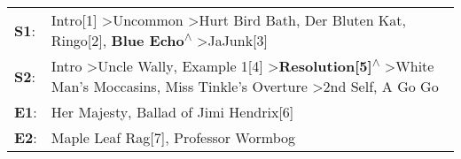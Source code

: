 \begin{supertabular}{p{0.03\textwidth}p{0.92\textwidth}}
 \textbf{S1}:  &                                                                        Intro[1]\textsuperscript{} \textgreater \enspace Uncommon\textsuperscript{} \textgreater \enspace Hurt Bird Bath\textsuperscript{}, \enspace Der Bluten Kat\textsuperscript{}, \enspace Ringo[2]\textsuperscript{}, \enspace \textbf{Blue Echo\textsuperscript{$\wedge$}} \textgreater \enspace JaJunk[3]\textsuperscript{}  \enspace  \\
 \textbf{S2}:  &  Intro\textsuperscript{} \textgreater \enspace Uncle Wally\textsuperscript{}, \enspace Example 1[4]\textsuperscript{} \textgreater \enspace \textbf{Resolution[5]\textsuperscript{$\wedge$}} \textgreater \enspace White Man's Moccasins\textsuperscript{}, \enspace Miss Tinkle's Overture\textsuperscript{} \textgreater \enspace 2nd Self\textsuperscript{}, \enspace A Go Go\textsuperscript{}  \enspace  \\
 \textbf{E1}:  &                                                                                                                                                                                                                                                                                                                Her Majesty\textsuperscript{}, \enspace Ballad of Jimi Hendrix[6]\textsuperscript{}  \enspace  \\
 \textbf{E2}:  &                                                                                                                                                                                                                                                                                                                  Maple Leaf Rag[7]\textsuperscript{}, \enspace Professor Wormbog\textsuperscript{}  \enspace  \\
\end{supertabular}
